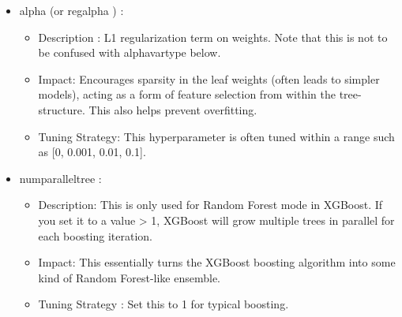 \begin{itemize}[noitemsep]
\item alpha (or reg\textunderscore alpha ) : 

\begin{itemize}[noitemsep] 
\item Description : L1 regularization term on weights. Note that this is not to be confused with alpha\textunderscore vartype below.
\item Impact: Encourages sparsity in the leaf weights (often leads to simpler models), acting as a form of feature selection from within the tree-structure. This also helps prevent overfitting. 
\item Tuning Strategy: This hyperparameter is often tuned within a range such as [0, 0.001, 0.01, 0.1].
\end{itemize} 

\item num\textunderscore parallel\textunderscore tree : 

\begin{itemize}[noitemsep] 
\item Description: This is only used for Random Forest mode in XGBoost. If you set it to a value > 1, XGBoost will grow multiple trees in parallel for each boosting iteration.
\item Impact: This essentially turns the XGBoost boosting algorithm into some kind of Random Forest-like ensemble.
\item Tuning Strategy : Set this to 1 for typical boosting. 
\end{itemize} 

\end{itemize} 
